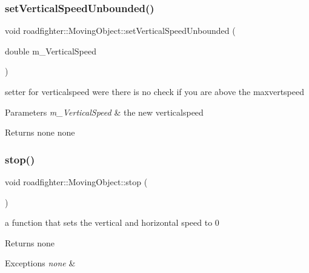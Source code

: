 \subsubsection{\texorpdfstring{set\+Vertical\+Speed\+Unbounded()}{setVerticalSpeedUnbounded()}}
{\footnotesize\ttfamily void roadfighter\+::\+Moving\+Object\+::set\+Vertical\+Speed\+Unbounded (\begin{DoxyParamCaption}\item[{double}]{m\+\_\+\+Vertical\+Speed }\end{DoxyParamCaption})}

setter for verticalspeed were there is no check if you are above the maxvertspeed 
\begin{DoxyParams}{Parameters}
{\em m\+\_\+\+Vertical\+Speed} & the new verticalspeed \\
\hline
\end{DoxyParams}
\begin{DoxyReturn}{Returns}
none  none 
\end{DoxyReturn}
\mbox{\label{classroadfighter_1_1MovingObject_ac9f197ee0e91754d2fd653c0b8c84c57}} 
\subsubsection{\texorpdfstring{stop()}{stop()}}
{\footnotesize\ttfamily void roadfighter\+::\+Moving\+Object\+::stop (\begin{DoxyParamCaption}{ }\end{DoxyParamCaption})\hspace{0.3cm}{\ttfamily [virtual]}}

a function that sets the vertical and horizontal speed to 0 \begin{DoxyReturn}{Returns}
none 
\end{DoxyReturn}

\begin{DoxyExceptions}{Exceptions}
{\em none} & \\
\hline
\end{DoxyExceptions}
\mbox{\label{classroadfighter_1_1MovingObject_a2c5d69054a59fc5c6d7458f864ee9d57}} 
